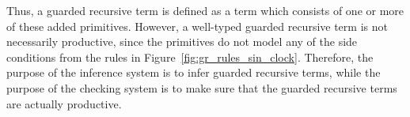 Thus, a guarded recursive term is defined as a term which consists of one or more of
these added primitives. However, a well-typed guarded recursive term is not
necessarily productive, since the primitives do not model any of the side
conditions from the rules in Figure~\ref{fig:gr_rules_sin_clock}. Therefore, the
purpose of the inference system is to infer guarded recursive terms, while the
purpose of the checking system is to make sure that the guarded recursive terms
are actually productive.



 


  
